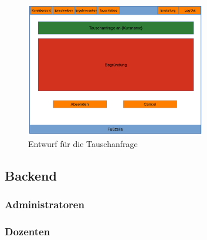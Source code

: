             \begin{figure}[t]
                \centering
                \includegraphics[width=0.7\textwidth]{./design/MockUpsFrontend/frontendSwap2.png}
                \caption{Entwurf für die Tauschanfrage}
                \label{mockupResultsFrontend}
            \end{figure}
            
    
        \subsection{Backend}
        	\subsubsection{Administratoren}
        	\subsubsection{Dozenten}